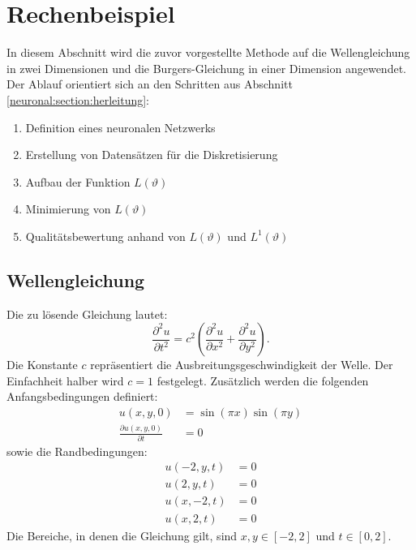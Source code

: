 %
%
%
%

\section{Rechenbeispiel}\label{neuronal:section:rechenbeispiel}

In diesem Abschnitt wird die zuvor vorgestellte Methode auf die Wellengleichung in zwei Dimensionen und die Burgers-Gleichung in einer Dimension angewendet.
Der Ablauf orientiert sich an den Schritten aus Abschnitt \ref{neuronal:section:herleitung}:
\begin{enumerate}
    \item Definition eines neuronalen Netzwerks
    \item Erstellung von Datensätzen für die Diskretisierung
    \item Aufbau der Funktion $L(\vartheta)$
    \item Minimierung von $L(\vartheta)$
    \item Qualitätsbewertung anhand von $L(\vartheta)$ und $L^1(\vartheta)$
\end{enumerate}

\subsection{Wellengleichung}\label{neuronal:subsection:wellengleichung}
Die zu lösende Gleichung lautet:
\begin{equation}
    \frac{\partial^2 u}{\partial t^2} = c^2 \left( \frac{\partial^2 u}{\partial x^2} + \frac{\partial^2 u}{\partial y^2} \right).
    \label{neuronal:wellengleichung}
\end{equation}
Die Konstante \( c \) repräsentiert die Ausbreitungsgeschwindigkeit der Welle. Der Einfachheit halber wird \( c = 1 \) festgelegt.
Zusätzlich werden die folgenden Anfangsbedingungen definiert:
\begin{equation}
    \begin{aligned}
        u(x, y, 0) &= \sin(\pi x) \sin(\pi y)\\
        \frac{\partial u(x, y, 0)}{\partial t} &= 0
    \end{aligned}
    \label{neuronal:wellen_anfangs}
\end{equation}
sowie die Randbedingungen:
\begin{equation}
    \begin{aligned}
        u(-2, y, t) &= 0\\
        u(2, y, t) &= 0\\
        u(x, -2, t) &= 0\\
        u(x, 2, t) &= 0
    \end{aligned}
    \label{neuronal:wellen_rand}
\end{equation}
Die Bereiche, in denen die Gleichung gilt, sind \( x, y \in [-2,2] \) und \( t \in [0,2] \).

